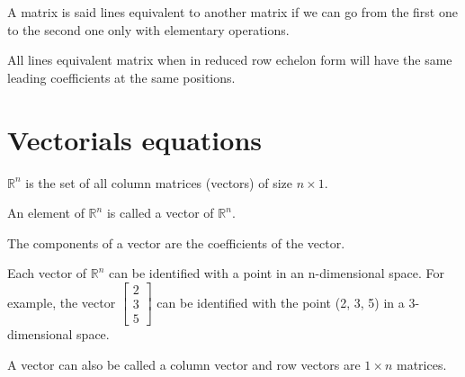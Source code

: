 \begin{definition}
    A matrix is said lines equivalent to another matrix if we can go from the first one to the second one only with elementary operations.
\end{definition}
All lines equivalent matrix when in reduced row echelon form will have the same leading coefficients at the same positions.

\section{Vectorials equations}

\begin{definition}[$\mathbb{R}^n$]
    $\mathbb{R}^n$ is the set of all column matrices (vectors) of size $n \times 1$.
\end{definition}

\begin{definition}
    An element of $\mathbb{R}^n$ is called a vector of $\mathbb{R}^n$.
\end{definition}

\begin{definition}[Components]
    The components of a vector are the coefficients of the vector.
\end{definition}

\begin{eg}
    Each vector of $\mathbb{R}^n$ can be identified with a point in an n-dimensional space. For example, the vector $\begin{bmatrix} 2 \\ 3 \\ 5 \end{bmatrix}$ can be identified with the point (2, 3, 5) in a 3-dimensional space.
\end{eg}
A vector can also be called a column vector and row vectors are $1 \times n$ matrices.

